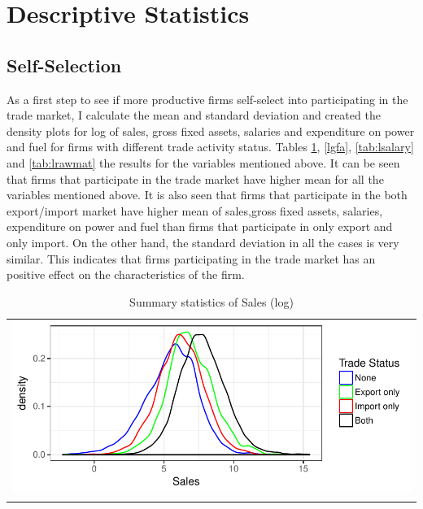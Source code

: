 \documentclass[11pt]{article}
\begin{document}
\section{Descriptive Statistics}
\subsection{Self-Selection}
As a first step to see if more productive firms self-select into
participating in the trade market, I calculate the mean and standard
deviation and created the density plots for log of  sales, gross fixed assets,
salaries and  expenditure on power and fuel for firms with different
trade activity status. 
Tables \ref{lsales}, \ref{lgfa}, \ref{tab:lsalary} and \ref{tab:lrawmat} the results for the variables mentioned above. 
It can be seen that firms that participate in the trade market have
higher mean for all the variables mentioned above. It is also seen
that firms that participate in the both export/import market have
higher mean of sales,gross fixed assets,
salaries, expenditure on power and fuel than firms that participate in
only export and only import. On the other hand, the standard deviation in all
the cases is very similar. This indicates that firms participating
in the trade market has an positive effect on the characteristics of the firm.
\begin{center}
\begin{table}[htp]
\caption{Summary statistics of Sales (log)}
\label{lsales}
\begin{tabular}{c}
 \includegraphics{./PICS/denslsales.pdf}   \\ 
   \\  
\end{tabular}
\end{table}
\end{center}
\end{document}
